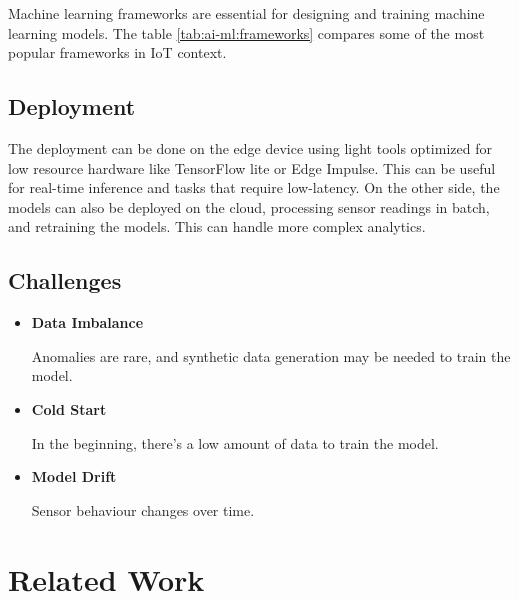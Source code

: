 Machine learning frameworks are essential for designing and training machine
learning models. The table \ref{tab:ai-ml:frameworks}
compares some of the most popular frameworks in \gls{IoT} context.

\subsection{Deployment}

The deployment can be done on the edge device using light tools optimized for
low resource hardware like TensorFlow lite or Edge Impulse. This can be useful
for real-time inference and tasks that require low-latency.
On the other side, the models can also be deployed on the cloud, processing
sensor readings in batch, and retraining the models. This can handle more
complex analytics.

\subsection{Challenges}

\begin{itemize}
	\item \textbf{Data Imbalance}

	      Anomalies are rare, and synthetic data generation may be needed to train
	      the model.
	\item \textbf{Cold Start}

	      In the beginning, there's a low amount of data to train the model.
	\item \textbf{Model Drift}

	      Sensor behaviour changes over time.
\end{itemize}

\section{Related Work}


